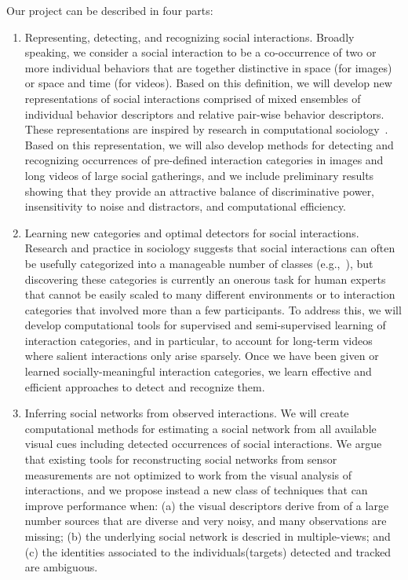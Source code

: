 Our project can be described in four parts:
\begin{enumerate}

\item Representing, detecting, and recognizing social interactions. Broadly speaking, we consider a social interaction to be a co-occurrence of two or more individual behaviors that are together distinctive in space (for images) or space and time (for videos). Based on this definition, we will develop new representations of social interactions comprised of mixed ensembles of individual behavior descriptors and relative pair-wise behavior descriptors. These representations are inspired by research in computational sociology~\cite{Kendon1990,Lazer2009,Pantic}. Based on this representation, we will also develop methods for detecting and recognizing occurrences of pre-defined interaction categories in images and long videos of large social gatherings, and we include preliminary results showing that they provide an attractive balance of discriminative power, insensitivity to noise and distractors, and computational efficiency.


\item Learning new categories and optimal detectors for social interactions. Research and practice in sociology suggests that social interactions can often be usefully categorized into a manageable number of classes (e.g.,~\cite{Kendon1990,Hoyle,Tannen,econo_category,Scherr2009}), but discovering these categories is currently an onerous task for human experts that cannot be easily scaled to many different environments or to interaction categories that involved more than a few participants. To address this, we will develop computational tools for supervised and semi-supervised learning of interaction categories, and in particular, to account for long-term videos where salient interactions only arise sparsely. Once we have been given or learned socially-meaningful interaction categories, we learn effective and efficient approaches to detect and recognize them.


\item Inferring social networks from observed interactions. We will create computational methods for estimating a social network from all available visual cues including detected occurrences of social interactions. We argue that existing tools for reconstructing social networks from sensor measurements are not optimized to work from the visual analysis of interactions, and we propose instead a new class of techniques that can improve performance when: (a) the visual descriptors derive from of a large number sources that are diverse and very noisy, and many observations are missing; (b) the underlying social network is descried in multiple-views; and (c) the identities associated to the individuals(targets) detected and tracked are ambiguous. 


\end{enumerate}

